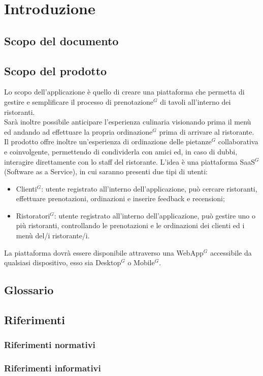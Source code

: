 \section{Introduzione}
\subsection{Scopo del documento}
\subsection{Scopo del prodotto}
Lo scopo dell'applicazione è quello di creare una piattaforma che permetta di gestire e semplificare
il processo di prenotazione$^{G}$ di tavoli all'interno dei ristoranti. \\
Sarà inoltre possibile anticipare l'esperienza culinaria visionando prima il menù ed 
andando ad effettuare la propria ordinazione$^{G}$ prima di arrivare al ristorante. \\
Il prodotto offre inoltre un’esperienza di ordinazione delle pietanze$^{G}$ collaborativa e coinvolgente, 
permettendo di condividerla con amici ed, in caso di dubbi, interagire direttamente con lo staff del ristorante.
L’idea è una piattaforma SaaS$^{G}$ (Software as a Service), in cui saranno presenti due tipi di utenti:
\begin{itemize}
    \item Clienti$^{G}$: utente registrato all’interno dell’applicazione, può cercare ristoranti, effettuare prenotazioni, ordinazioni e inserire feedback e recensioni;
    \item Ristoratori$^{G}$: utente registrato all’interno dell’applicazione, può gestire uno o più ristoranti, controllando le prenotazioni e le ordinazioni dei clienti ed i menù del/i ristorante/i.
\end{itemize}
La piattaforma dovrà essere  disponibile attraverso una WebApp$^{G}$ accessibile da qualsiasi dispositivo, esso sia Desktop$^{G}$ o Mobile$^{G}$.
\subsection{Glossario}
\subsection{Riferimenti}
\subsubsection{Riferimenti normativi}
\subsubsection{Riferimenti informativi}

